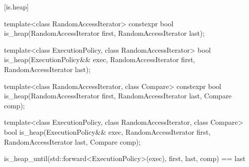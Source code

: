 [is.heap]{}

%
\begin{itemdecl}
template<class RandomAccessIterator>
  constexpr bool is_heap(RandomAccessIterator first, RandomAccessIterator last);
\end{itemdecl}

\begin{itemdescr}
\pnum
\returns {}
\end{itemdescr}


%
\begin{itemdecl}
template<class ExecutionPolicy, class RandomAccessIterator>
  bool is_heap(ExecutionPolicy&& exec,
               RandomAccessIterator first, RandomAccessIterator last);
\end{itemdecl}

\begin{itemdescr}
\pnum
\returns {}
\end{itemdescr}


%
\begin{itemdecl}
template<class RandomAccessIterator, class Compare>
  constexpr bool is_heap(RandomAccessIterator first, RandomAccessIterator last,
                         Compare comp);
\end{itemdecl}

\begin{itemdescr}
\pnum
\returns {}
\end{itemdescr}


%
\begin{itemdecl}
template<class ExecutionPolicy, class RandomAccessIterator, class Compare>
  bool is_heap(ExecutionPolicy&& exec,
               RandomAccessIterator first, RandomAccessIterator last,
               Compare comp);
\end{itemdecl}

\begin{itemdescr}
\pnum
\returns
\begin{codeblock}
is_heap_until(std::forward<ExecutionPolicy>(exec), first, last, comp) == last
\end{codeblock}
\end{itemdescr}


